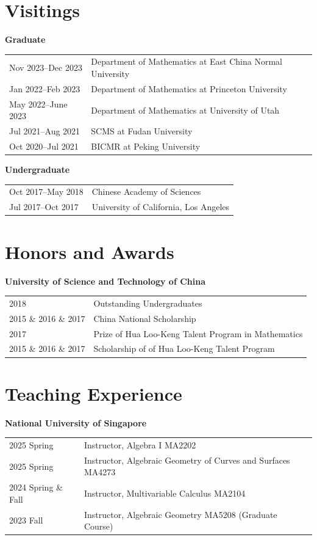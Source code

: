 \documentclass[margin,line,pifont,palatino,courier]{res}
\begin{document}
\begin{resume}
\section{\sc Visitings}

{\bf  Graduate}

\begin{tabular}{@{}p{1.5in}p{7in}}
Nov 2023--Dec 2023& Department of Mathematics at East China Normal University\\
Jan 2022--Feb 2023& Department of Mathematics at Princeton University\\
May 2022--June 2023& Department of Mathematics at University of Utah\\
Jul 2021--Aug 2021& SCMS at Fudan University\\
Oct 2020--Jul 2021& BICMR at Peking University
\end{tabular}

{\bf  Undergraduate}

\begin{tabular}{@{}p{1.5in}p{7in}}
Oct 2017--May 2018 & Chinese Academy of Sciences\\
Jul 2017--Oct 2017& University of California, Los Angeles
\end{tabular}

\section{\sc Honors and Awards}

{\bf  University of Science and Technology of China}

\begin{tabular}{@{}p{1.5in}p{7in}}
2018 & Outstanding Undergraduates\\
2015 \& 2016 \& 2017& China National Scholarship\\
2017 & Prize of Hua Loo-Keng Talent Program in Mathematics\\
2015 \& 2016 \& 2017& Scholarship of of Hua Loo-Keng Talent Program
\end{tabular}


\section{\sc Teaching Experience}
{\bf  National University of Singapore}


\begin{tabular}{@{}p{1.5in}p{4in}}
2025 Spring & Instructor, Algebra I MA2202\\
2025 Spring & Instructor, Algebraic Geometry of Curves and Surfaces MA4273\\
2024 Spring \& Fall & Instructor, Multivariable Calculus MA2104\\
2023 Fall & Instructor, Algebraic Geometry MA5208 (Graduate Course)
\end{tabular}


\end{resume}
\end{document}

